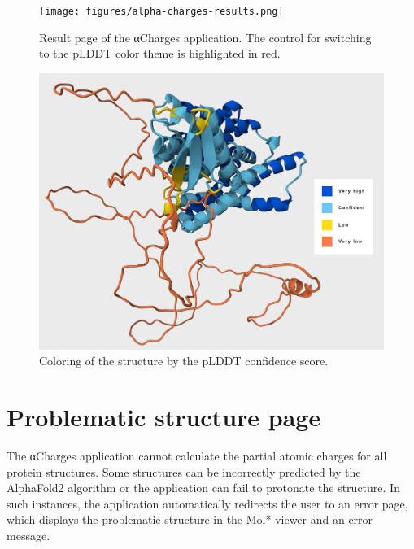 \documentclass[
  digital,     %
  oneside,     %
  nosansbold,  %
  nocolorbold, %
  lof,         %
  lot,         %
]{fithesis4}
\begin{document}
\begin{figure}[htbp]
  \begin{center}
    \texttt{[image: figures/alpha-charges-results.png]}
  \end{center}
  \caption{Result page of the αCharges application. The control for switching to the pLDDT color theme is highlighted in red.}
  \label{fig:alpha-charges-results}
\end{figure}

\begin{figure}[htbp]
  \begin{center}
    \includegraphics[width=\textwidth,frame]{figures/alphafold_coloring.png}
  \end{center}
  \caption{Coloring of the structure by the pLDDT confidence score.}
  \label{fig:alphafold-coloring}
\end{figure}

\section{Problematic structure page}

The αCharges application cannot calculate the partial atomic charges for all protein structures. Some structures can be incorrectly predicted by the AlphaFold2 algorithm or the application can fail to protonate the structure.
\cite{jumper2021alphafold} In such instances, the application automatically redirects the user to an error page, which displays the problematic structure in the Mol* viewer and an error message.
\end{document}
